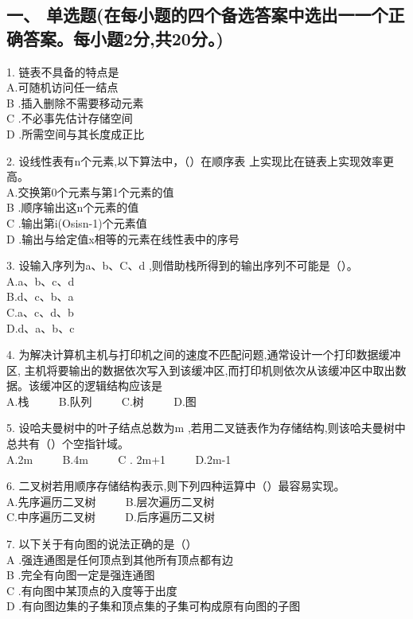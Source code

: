 
\subsection{一、 单选题(在每小题的四个备选答案中选出一一个正确答案。每小题2分,共20分。)}

1. 链表不具备的特点是 \\
A.可随机访问任一结点 \\
B .插入删除不需要移动元素 \\
C .不必事先估计存储空间 \\
D .所需空间与其长度成正比

2. 设线性表有n个元素,以下算法中，（）在顺序表 上实现比在链表上实现效率更高。 \\
A.交换第0个元素与第1个元素的值 \\
B .顺序输出这n个元素的值 \\
C .输出第i(Osisn-1)个元素值 \\
D .输出与给定值x相等的元素在线性表中的序号

3. 设输入序列为a、b、C、d ,则借助栈所得到的输出序列不可能是（）。 \\
A.a、b、c、d \\
B.d、c、b、a \\
C.a、c、d、b \\
D.d、a、b、c

4. 为解决计算机主机与打印机之间的速度不匹配问题,通常设计一个打印数据缓冲区, 主机将要输出的数据依次写入到该缓冲区,而打印机则依次从该缓冲区中取出数据。该缓冲区的逻辑结构应该是 \\
A.栈 $\qquad$ B.队列 $\qquad$ C.树 $\qquad$ D.图

5. 设哈夫曼树中的叶子结点总数为m ,若用二叉链表作为存储结构,则该哈夫曼树中总共有（）个空指针域。 \\
A.2m $\qquad$ B.4m $\qquad$ C . 2m+1 $\qquad$ D.2m-1

6. 二叉树若用顺序存储结构表示,则下列四种运算中（）最容易实现。 \\
A.先序遍历二叉树 $\qquad$ B.层次遍历二叉树 \\
C.中序遍历二叉树 $\qquad$ D.后序遍历二又树

7. 以下关于有向图的说法正确的是（） \\
A .强连通图是任何顶点到其他所有顶点都有边 \\
B .完全有向图一定是强连通图 \\
C .有向图中某顶点的入度等于出度 \\
D .有向图边集的子集和顶点集的子集可构成原有向图的子图


